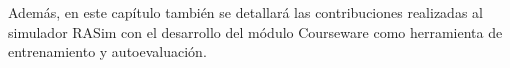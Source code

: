 Además, en este capítulo también se detallará las contribuciones realizadas al simulador \ac{RASim} con el desarrollo del módulo \ac{Courseware} como herramienta de entrenamiento y autoevaluación.











